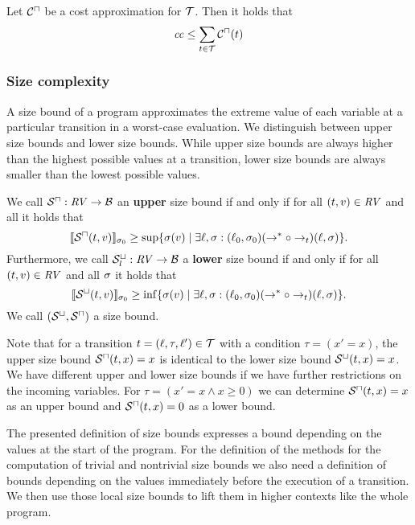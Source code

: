 \begin{theorem}
	Let ${\mathcal{C}^\sqcap}$ be a cost approximation for $\mathcal{T}$.
	Then it holds that 
	\[ \mathit{cc} \leq \sum_{t \in \mathcal{T}} {\mathcal{C}^\sqcap}(t) \]
\end{theorem}

\subsubsection{Size complexity}

A size bound of a program approximates the extreme value of each variable at a particular transition in a worst-case evaluation.
We distinguish between upper size bounds and lower size bounds.
While upper size bounds are always higher than the highest possible values at a transition, lower size bounds are always smaller than the lowest possible values.

\begin{definition}
  We call ${\mathcal{S}^\sqcap}: \mathit{RV} \rightarrow \mathcal{B}$ an \textbf{upper} size bound if and only if for all $(t, v) \in \mathit{RV}$ and all  it holds that
  \[ \llbracket {\mathcal{S}^\sqcap}(t, v) \rrbracket_{\sigma_0} \geq \sup \lbrace \sigma(v) \mid \exists \ell, \sigma: (\ell_0, \sigma_0) (\rightarrow^* \circ \rightarrow_t) (\ell, \sigma) \rbrace. \]
  Furthermore, we call ${\mathcal{S}^\sqcup_l}: \mathit{RV} \rightarrow \mathcal{B}$ a \textbf{lower} size bound if and only if for all $(t, v) \in \mathit{RV}$ and all $\sigma$ it holds that
  \[ \llbracket {\mathcal{S}^\sqcup}(t, v) \rrbracket_{\sigma_0} \geq \inf \lbrace \sigma(v) \mid \exists \ell, \sigma: (\ell_0, \sigma_0) (\rightarrow^* \circ \rightarrow_t) (\ell, \sigma) \rbrace. \]
  We call ${({\mathcal{S}^\sqcup}, {\mathcal{S}^\sqcap})}$ a size bound.
\end{definition}

Note that for a transition $t = (\ell,\tau,\ell') \in \mathcal{T}$ with a condition $\tau = (x' = x)$, the upper size bound ${\mathcal{S}^\sqcap}(t,x) = x$ is identical to the lower size bound ${\mathcal{S}^\sqcup}(t,x) = x$.
We have different upper and lower size bounds if we have further restrictions on the incoming variables.
For $\tau = (x' = x \wedge x \geq 0)$ we can determine ${\mathcal{S}^\sqcap}(t,x) = x$ as an upper bound and ${\mathcal{S}^\sqcap}(t,x) = 0$ as a lower bound.

The presented definition of size bounds expresses a bound depending on the values at the start of the program.
For the definition of the methods for the computation of trivial and nontrivial size bounds we also need a definition of bounds depending on the values immediately before the execution of a transition.
We then use those local size bounds to lift them in higher contexts like the whole program.

